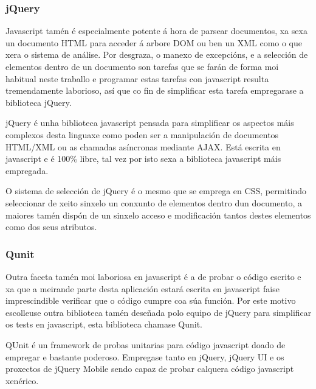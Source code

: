         \subsubsection{jQuery}
    
            Javascript tamén é especialmente potente á hora de parsear documentos, xa sexa
            un documento HTML para acceder á arbore DOM ou ben un XML como o que xera o sistema de 
            análise. Por desgraza, o manexo de excepcións, e a selección de elementos dentro de un 
            documento son tarefas que se farán de forma moi habitual neste traballo e programar 
            estas tarefas con javascript resulta tremendamente laborioso, así que co fin de 
            simplificar esta tarefa empregarase a biblioteca jQuery.
                
            jQuery é unha biblioteca javascript pensada para simplificar os aspectos máis complexos desta 
            linguaxe como poden ser a manipulación de documentos HTML/XML ou as chamadas asíncronas 
            mediante AJAX. Está escrita en javascript e é 100\% libre, tal vez por isto sexa a biblioteca
            javascript máis empregada.
            
            O sistema de selección de jQuery é o mesmo que se emprega en CSS, permitindo seleccionar de 
            xeito sinxelo un conxunto de elementos dentro dun documento, a maiores tamén dispón de un 
            sinxelo acceso e modificación tantos destes elementos como dos seus atributos.
            
        \subsubsection{Qunit}
        
            Outra faceta tamén moi laboriosa en javascript é a de probar o código escrito e xa que 
            a meirande parte desta aplicación estará escrita en javascript faise imprescindible 
            verificar que o código cumpre coa súa función. Por este motivo escolleuse outra 
            biblioteca tamén deseñada polo equipo de jQuery para simplificar os tests en javascript,
            esta biblioteca chamase Qunit.
            
            QUnit é un framework de probas unitarias para código javascript doado de empregar e bastante
            poderoso. Empregase tanto en jQuery, jQuery UI e os proxectos de jQuery Mobile sendo capaz 
            de probar calquera código javascript xenérico.
            
